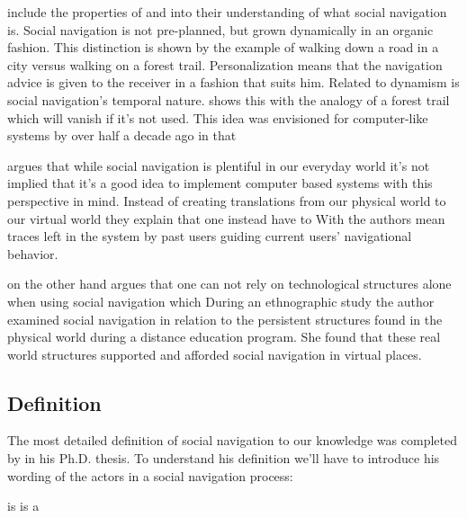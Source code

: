 \citet[]{dieberger00b} include the properties of 
and  into their understanding of what social navigation is.
Social navigation is not pre-planned, but grown dynamically in an organic
fashion. This distinction is shown by the example of walking down a road in a
city versus walking on a forest trail. Personalization means that the
navigation advice is given to the receiver in a fashion that suits him.
Related to dynamism is social navigation's temporal nature.
\citet[]{dieberger00b} shows this with the analogy of a forest trail
which will vanish if it's not used. This idea was envisioned for computer-like
systems by \citeauthor{bush45} over half a decade ago in that

\citet{svensson05} argues that while social navigation is plentiful in
our everyday world it's not implied that it's a good idea to implement
computer based systems with this perspective in mind. Instead of creating
translations from our physical world to our virtual world
they explain that one instead have to
With  the authors mean traces left in the system by past
users guiding current users' navigational behavior.

\citeauthor{robins02} on the other hand argues that one can not rely on
technological structures alone when using social navigation which
During an ethnographic study the author examined social navigation in relation
to the persistent structures found in the physical world during a distance
education program. She found that these real world structures supported and
afforded social navigation in virtual places.

\subsection{Definition}

The most detailed definition of social navigation to our knowledge was
completed by \citet{svensson03} in his Ph.D. thesis. To understand his
definition we'll have to introduce his wording of the actors in a social
navigation process:

\begin{items}
   is 
   is a 
\end{items}

